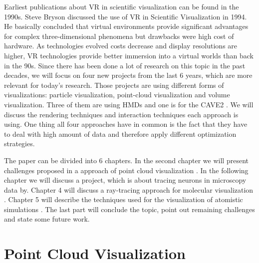 \documentclass[10pt,twocolumn,letterpaper]{article}
\begin{document}
\setlength{\parindent}{1pc}Earliest publications about VR in scientific visualization can be found in the 1990s. Steve Bryson \cite{bryson1994virtual} discussed the use of VR in Scientific Visualization in 1994. He basically concluded that virtual environments provide significant advantages for complex three-dimensional phenomena but drawbacks were high cost of hardware. As technologies evolved costs decrease and display resolutions are higher, VR technologies provide better immersion into a virtual worlds than back in the 90s. Since there has been done a lot of research on this topic in the past decades, we will focus on four new projects from the last 6 years, which are more relevant for today's research. Those projects are using different forms of visualizations: particle visualization, point-cloud visualization and volume visualization. Three of them are using HMDs and one is for the CAVE2 \cite{febretti2013cave2}. We will discuss the rendering techniques and interaction techniques each approach is using. One thing all four approaches have in common is the fact that they have to deal with high amount of data and therefore apply different optimization strategies.

\setlength{\parindent}{1pc}The paper can be divided into 6 chapters. In the second chapter we will present challenges proposed in a approach of point cloud visualization \cite{discher_point-based_2018}. In the following chapter we will discuss a project, which is about tracing neurons in microscopy data \cite{Usher2018} by. Chapter 4 will discuss a ray-tracing approach for molecular visualization \cite{stone_immersive_2016}. Chapter 5 will describe the techniques used for the visualization of atomistic simulations \cite{reda_visualizing_2013}. The last part will conclude the topic, point out remaining challenges and state some future work.

\section{Point Cloud Visualization}
\end{document}
